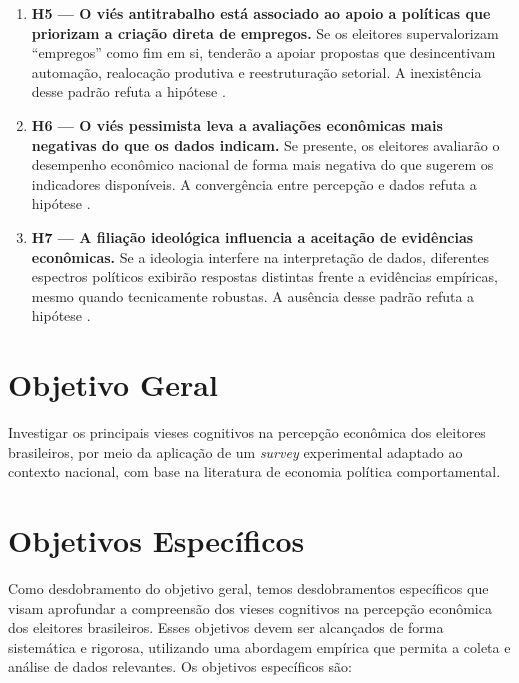 \begin{enumerate}[label=\alph*)]
  \item \textbf{H5 — O viés antitrabalho está associado ao apoio a políticas que priorizam a criação direta de empregos.}
  Se os eleitores supervalorizam “empregos” como fim em si, tenderão a apoiar propostas que desincentivam automação, realocação produtiva e reestruturação setorial. A inexistência desse padrão refuta a hipótese \cite{The_Myth_of_the_Rational_Voter,landsburg2012armchair}.

  \item \textbf{H6 — O viés pessimista leva a avaliações econômicas mais negativas do que os dados indicam.}
  Se presente, os eleitores avaliarão o desempenho econômico nacional de forma mais negativa do que sugerem os indicadores disponíveis. A convergência entre percepção e dados refuta a hipótese \cite{The_Myth_of_the_Rational_Voter,easterbrook2004progress}.

  \item \textbf{H7 — A filiação ideológica influencia a aceitação de evidências econômicas.}
  Se a ideologia interfere na interpretação de dados, diferentes espectros políticos exibirão respostas distintas frente a evidências empíricas, mesmo quando tecnicamente robustas. A ausência desse padrão refuta a hipótese \cite{The_Myth_of_the_Rational_Voter,kahan2012polarization}.

\end{enumerate}

\section{Objetivo Geral}\label{sec:objetivo-geral}

Investigar os principais vieses cognitivos na percepção econômica dos eleitores brasileiros, por meio da aplicação de um \textit{survey} experimental adaptado ao contexto nacional, com base na literatura de economia política comportamental.

\section{Objetivos Específicos}\label{sec:objetivos-especificos}


Como desdobramento do objetivo geral, temos desdobramentos específicos que visam aprofundar a compreensão dos vieses cognitivos na percepção econômica dos eleitores brasileiros. Esses objetivos devem ser alcançados de forma sistemática e rigorosa, utilizando uma abordagem empírica que permita a coleta e análise de dados relevantes. Os objetivos específicos são:


